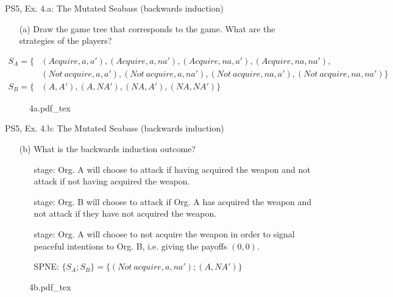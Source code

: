 \begin{frame}{PS5, Ex. 4.a: The Mutated Seabass (backwards induction)}
  \begin{itemize}
    \item[(a)] Draw the game tree that corresponds to the game. What are the strategies of the players?
  \end{itemize}
  \vspace{-8pt}
  \begin{align*}
    S_A=\{ &(Acquire, a, a'), (Acquire, a, na'), (Acquire, na, a'), (Acquire, na, na'),\\
            &(Not\ acquire, a, a'), (Not\ acquire, a, na'), (Not\ acquire, na, a'), (Not\ acquire, na, na') \}\\
    S_B=\{ &(A, A'), (A, NA'), (NA, A'), (NA, NA') \}
  \end{align*}
  \vspace{-8pt}
  \begin{figure}[!h]
    \center
    \def\svgwidth{\columnwidth}
    {4a.pdf_tex}
  \end{figure}
  \vfill\null
\end{frame}

\begin{frame}{PS5, Ex. 4.b: The Mutated Seabass (backwards induction)}
  \begin{itemize}
    \item[(b)] What is the backwards induction outcome?
    \begin{itemize}\normalsize
      \item[\nth{3} stage:] Org. A will choose to attack if having acquired the weapon and not attack if not having acquired the weapon.
      \item[\nth{2} stage:] Org. B will choose to attack if Org. A has acquired the weapon and not attack if they have not acquired the weapon.
      \item[\nth{1} stage:] Org. A will choose to not acquire the weapon in order to signal peaceful intentions to Org. B, i.e. giving the payoffs $(0,0)$.
      \item[SPNE:] $\{S_A;S_B\}=\{ (Not\ acquire, a, na');(A, NA') \}$
    \end{itemize}
  \end{itemize}
  \vspace{-8pt}
  \begin{figure}[!h]
    \center
    \def\svgwidth{\columnwidth}
    {4b.pdf_tex}
  \end{figure}
  \vfill\null
\end{frame}

